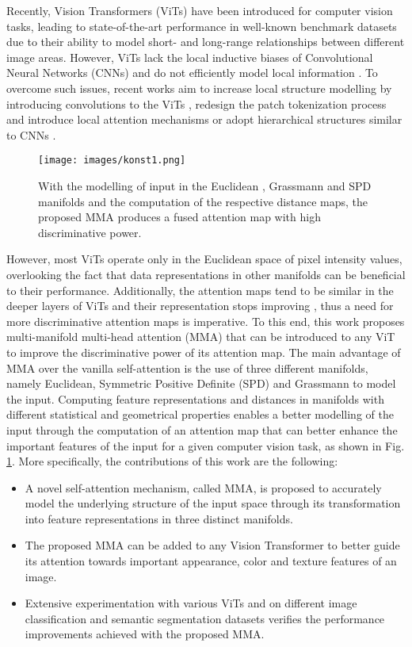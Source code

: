 \documentclass[10pt,twocolumn,letterpaper]{article}
\begin{document}
Recently, Vision Transformers (ViTs) \cite{Author3} have been introduced for computer vision tasks, leading to state-of-the-art performance in well-known benchmark datasets due to their ability to model short- and long-range relationships between different image areas. However, ViTs lack the local inductive biases of Convolutional Neural Networks (CNNs) and do not efficiently model local information \cite{Author5}. To overcome such issues, recent works aim to increase local structure modelling by introducing convolutions to the ViTs \cite{Author1,Author5,Author6}, redesign the patch tokenization process and introduce local attention mechanisms \cite{Author8,Author9,Author48,Author50} or adopt hierarchical structures similar to CNNs \cite{Author8,Author10,Author11}.

\begin{figure}[t]
  \centering
  \texttt{[image: images/konst1.png]}
  \caption{With the modelling of input in the Euclidean , Grassmann  and SPD  manifolds and the computation of the respective distance maps, the proposed MMA produces a fused attention map with high discriminative power.}
  \label{fig:motivation}
\end{figure}

However, most ViTs operate only in the Euclidean space of pixel intensity values, overlooking the fact that data representations in other manifolds can be beneficial to their performance. Additionally, the attention maps tend to be similar in the deeper layers of ViTs and their representation stops improving \cite{Author30}, thus a need for more discriminative attention maps is imperative. To this end, this work proposes multi-manifold multi-head attention (MMA) that can be introduced to any ViT to improve the discriminative power of its attention map. The main advantage of MMA over the vanilla self-attention is the use of three different manifolds, namely Euclidean, Symmetric Positive Definite (SPD) and Grassmann to model the input. Computing feature representations and distances in manifolds with different statistical and geometrical properties enables a better modelling of the input through the computation of an attention map that can better enhance the important features of the input for a given computer vision task, as shown in Fig. \ref{fig:motivation}. More specifically, the contributions of this work are the following:
\begin{itemize}
\item A novel self-attention mechanism, called MMA, is proposed to accurately model the underlying structure of the input space through its transformation into feature representations in three distinct manifolds.
\item The proposed MMA can be added to any Vision Transformer to better guide its attention towards important appearance, color and texture features of an image.
\item Extensive experimentation with various ViTs and on different image classification and semantic segmentation datasets verifies the performance improvements achieved with the proposed MMA.
\end{itemize}
\end{document}
